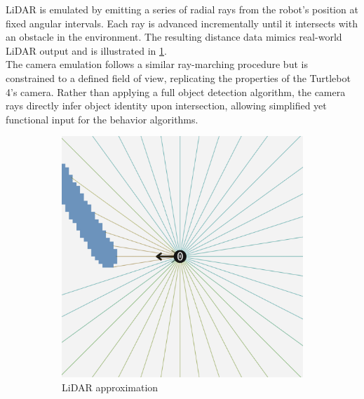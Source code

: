 LiDAR is emulated by emitting a series of radial rays from the robot's position at fixed angular intervals. Each ray is advanced incrementally until it intersects with an obstacle in the environment. The resulting distance data mimics real-world LiDAR output and is illustrated in \cref{fig:lidar-approximation}. \\

The camera emulation follows a similar ray-marching procedure but is constrained to a defined field of view, replicating the properties of the Turtlebot 4’s camera. Rather than applying a full object detection algorithm, the camera rays directly infer object identity upon intersection, allowing simplified yet functional input for the behavior algorithms.

\begin{figure}[H]
    \centering
    \begin{subfigure}[b]{0.45\textwidth}
        \centering
        \includegraphics[width=\textwidth]{figures/screenshots/simple-lidar.png}
        \caption{LiDAR approximation}
        \label{fig:lidar-approximation}
    \end{subfigure}
    \hfill
    \begin{subfigure}[b]{0.45\textwidth}
        \centering

\end{subfigure}
\end{figure}
